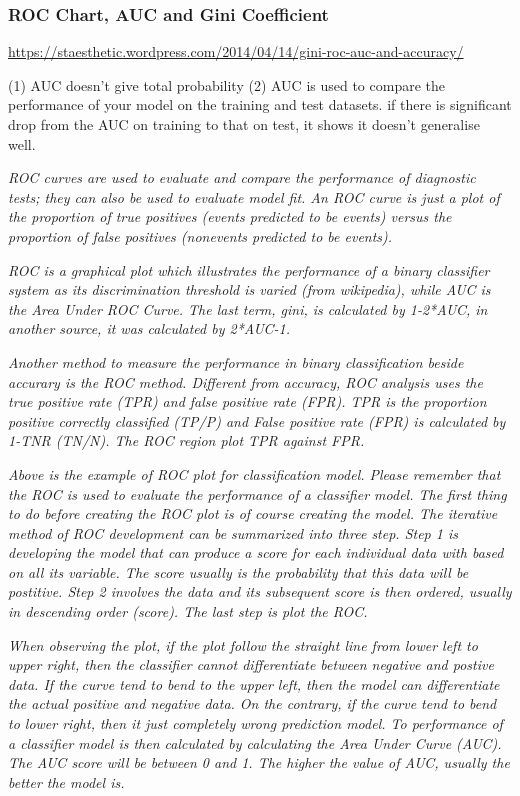 \subsubsection{ROC Chart, AUC and Gini Coefficient}
\url{https://staesthetic.wordpress.com/2014/04/14/gini-roc-auc-and-accuracy/}

(1) AUC doesn't give total probability 
(2) AUC is used to compare the performance of your model on the training and test datasets. if there is significant drop from the AUC on training to that on test, it shows it doesn't generalise well.

\textit{ROC curves are used to evaluate and compare the performance of diagnostic tests; they can also be used to evaluate model fit. An ROC curve is just a plot of the proportion of true positives (events predicted to be events) versus the proportion of false positives (nonevents predicted to be events).}

\textit{ROC is a graphical plot which illustrates the performance of a binary classifier system as its discrimination threshold is varied (from wikipedia), while AUC is the Area Under ROC Curve. The last term, gini, is calculated by 1-2*AUC, in another source, it was calculated by 2*AUC-1.}

\textit{Another method to measure the performance in binary classification beside accurary is the ROC method. Different from accuracy, ROC analysis uses the true positive rate (TPR) and false positive rate (FPR). TPR is the proportion positive correctly classified (TP/P) and  False positive rate (FPR) is calculated by 1-TNR (TN/N). The ROC region plot TPR against FPR.}

\textit{Above is the example of ROC plot for classification model. Please remember that the ROC is used to evaluate the performance of a classifier model. The first thing to do before creating the ROC plot is of course creating the model. The iterative method of ROC development can be summarized into three step. Step 1 is developing the model that can produce a score for each individual data with based on all its variable. The score usually is the probability that this data will be postitive. Step 2 involves the data and its subsequent score is then ordered, usually in descending order (score). The last step is plot the ROC.}

\textit{When observing the plot, if the plot follow the straight line from lower left to upper right, then the classifier cannot differentiate between negative and postive data. If the curve tend to bend to the upper left, then the model can differentiate the actual positive and negative data. On the contrary, if the curve tend to bend to lower right, then it just completely wrong prediction model.
To performance of a classifier model is then calculated by calculating the Area Under Curve (AUC). The AUC score will be between 0 and 1. The higher the value of AUC, usually the better the model is.}

